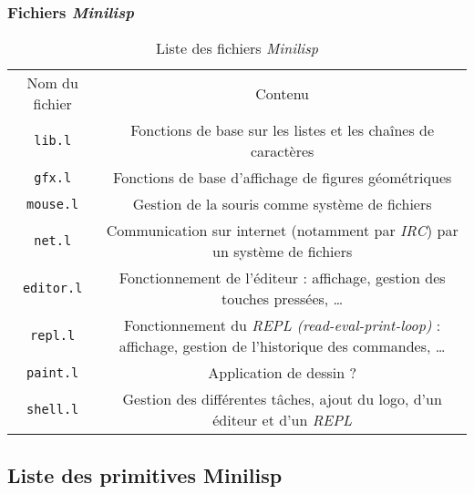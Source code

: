 \documentclass[c, 11pt, handout, xcolor=table]{beamer}
\newcommand{\code}[1]{\texttt{#1}}
\newcommand{\foreign}[1]{\emph{#1}}
\begin{document}
\begin{frame}
 \frametitle{Fichiers \foreign{Minilisp}}
 
 \begin{table}[H]
  \centering
  \begin{tabularx}{\linewidth}{|C|C|}
    \hline
    Nom du fichier & Contenu \tabularnewline
    \hhline{|=|=|}
    \code{lib.l} & Fonctions de base sur les listes et les chaînes de caractères \tabularnewline
    \hline
    \code{gfx.l} & Fonctions de base d'affichage de figures géométriques \tabularnewline
    \hhline{|=|=|}
    \code{mouse.l} & Gestion de la souris comme système de fichiers \tabularnewline
    \hline
    \code{net.l} & Communication sur internet (notamment par \foreign{IRC}) par un système de fichiers \tabularnewline
    \hhline{|=|=|}
    \code{editor.l} & Fonctionnement de l'éditeur : affichage, gestion des touches pressées, \ldots \tabularnewline
    \hline
    \code{repl.l} & Fonctionnement du \foreign{REPL (read-eval-print-loop)} : affichage, gestion de l'historique des commandes, \ldots \tabularnewline
    \hline
    \code{paint.l} & Application de dessin ? \tabularnewline
    \hhline{|=|=|}
    \code{shell.l} & Gestion des différentes tâches, ajout du logo, d'un éditeur et d'un \foreign{REPL} \tabularnewline
    \hline
  \end{tabularx}
  \caption{Liste des fichiers \foreign{Minilisp}}
 \end{table}
\end{frame}


\subsection{Liste des primitives Minilisp}
\end{document}
